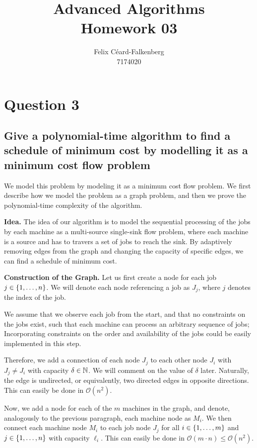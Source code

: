 \documentclass{article}
\title{Advanced Algorithms\\Homework 03}
\author{Felix Céard-Falkenberg\\7174020}
\begin{document}
\section{Question 3}
\subsection{\textbf{Give a polynomial-time algorithm to find a schedule of minimum cost by modelling it as a minimum cost flow problem}}


    

We model this problem by modeling it as a minimum cost flow problem.
We first describe how we model the problem as a graph problem, and then we prove the polynomial-time complexity of the algorithm.

\textbf{Idea.}
The idea of our algorithm is to model the sequential processing of the jobs by each machine as a multi-source single-sink flow problem, where each machine is a source and has to travers a set of jobs to reach the sink. By adaptively removing edges from the graph and changing the capacity of specific edges, we can find a schedule of minimum cost.

\textbf{Construction of the Graph.}
Let us first create a node for each job $j \in \left\{ 1, \dots, n \right\}$. We will denote each node referencing a job as $J_j$, where $j$ denotes the index of the job. 

We assume that we observe each job from the start, and that no constraints on the jobs exist, such that each machine can process an arbitrary sequence of jobs; Incorporating constraints on the order and availability of the jobs could be easily implemented in this step.

Therefore, we add a connection of each node $J_j$ to each other node $J_i$ with $J_j\neq J_i$ with capacity $\delta\in \mathbb{N}$. We will comment on the value of $\delta$ later. Naturally, the edge is undirected, or equivalently, two directed edges in opposite directions. This can easily be done in $\mathcal{O}(n^2)$.

Now, we add a node for each of the $m$ machines in the graph, and denote, analogously to the previous paragraph, each machine node as $M_i$. We then connect each machine node $M_i$ to each job node $J_j$ for all $i \in \left\{ 1, \dots, m \right\}$ and $j\in \left\{ 1, \dots, n \right\}$ with capacity $\ell_i$. This can easily be done in $\mathcal{O}(m\cdot n)\leq \mathcal{O}(n^2)$.
\end{document}
